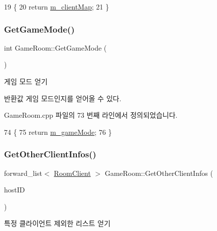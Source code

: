 \begin{DoxyCode}
19 \{
20     \textcolor{keywordflow}{return} \hyperlink{class_game_room_afc202a511605453216f7dd870ff96c5c}{m\_clientMap};
21 \}
\end{DoxyCode}
\mbox{\label{class_game_room_a73929e8bd9390ea46513d7f4ed48dec1}} 
\subsubsection{\texorpdfstring{Get\+Game\+Mode()}{GetGameMode()}}
{\footnotesize\ttfamily int Game\+Room\+::\+Get\+Game\+Mode (\begin{DoxyParamCaption}{ }\end{DoxyParamCaption})}



게임 모드 얻기 

\begin{DoxyReturn}{반환값}
게임 모드인지를 얻어올 수 있다. 
\end{DoxyReturn}


Game\+Room.\+cpp 파일의 73 번째 라인에서 정의되었습니다.


\begin{DoxyCode}
74 \{ 
75     \textcolor{keywordflow}{return} \hyperlink{class_game_room_a47c8f21ede7fd6fa526ebfcb069dcf45}{m\_gameMode}; 
76 \}
\end{DoxyCode}
\mbox{\label{class_game_room_acb8d3aa5a447d62dad96224d6eb4e8e4}} 
\subsubsection{\texorpdfstring{Get\+Other\+Client\+Infos()}{GetOtherClientInfos()}}
{\footnotesize\ttfamily forward\+\_\+list$<$ \hyperlink{class_room_client}{Room\+Client} $>$ Game\+Room\+::\+Get\+Other\+Client\+Infos (\begin{DoxyParamCaption}\item[{Host\+ID}]{host\+ID }\end{DoxyParamCaption})}



특정 클라이언트 제외한 리스트 얻기 

